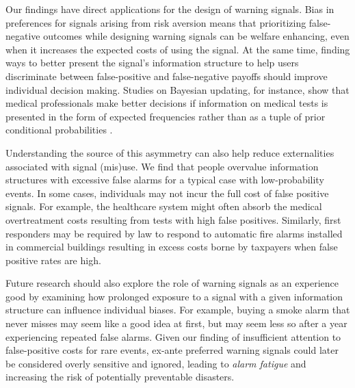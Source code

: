 \documentclass[12pt,a4paper]{article}
\begin{document}
Our findings have direct applications for the design of warning signals. Bias in preferences for signals arising from risk aversion means that prioritizing false-negative outcomes while designing warning signals can be welfare enhancing, even when it increases the expected costs of using the signal. At the same time, finding ways to better present the signal's information structure to help users discriminate between false-positive and false-negative payoffs should improve individual decision making. Studies on Bayesian updating, for instance, show that medical professionals make better decisions if information on medical tests is presented in the form of expected frequencies rather than as a tuple of prior conditional probabilities \citep{hoffrage_natural_2015, mcdowell_meta-analysis_2017}.

Understanding the source of this asymmetry can also help reduce externalities associated with signal (mis)use. We find that people overvalue information structures with excessive false alarms for a typical case with low-probability events. In some cases, individuals may not incur the full cost of false positive signals.  For example, the healthcare system might often absorb the medical overtreatment costs resulting from tests with high false positives.  Similarly, first responders may be required by law to respond to automatic fire alarms installed in commercial buildings resulting in excess costs borne by taxpayers when false positive rates are high. 

Future research should also explore the role of warning signals as an experience good by examining how prolonged exposure to a signal with a given information structure can influence individual biases. For example, buying a smoke alarm that never misses may seem like a good idea at first, but may seem less so after a year experiencing repeated false alarms. Given our finding of insufficient attention to false-positive costs for rare events, ex-ante preferred warning signals could later be considered overly sensitive and ignored, leading to \emph{alarm fatigue} and increasing the risk of potentially preventable disasters.

\end{document}
